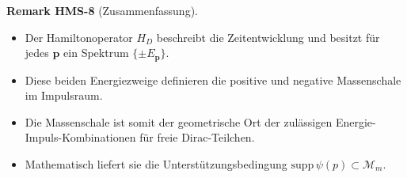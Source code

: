 \documentclass[10pt, letterpaper]{article}
\newcommand{\CustomHeading}[3]{%
  \par\medskip\noindent%
  \textbf{#1 #2} \textnormal{(#3)}.\enskip%
}
\newenvironment{REM}[2]{\begin{unitbox}\CustomHeading{Remark}{#1}{#2}}{\end{unitbox}}
\begin{document}
\begin{REM}{HMS-8}{Zusammenfassung}
\begin{itemize}
\item Der Hamiltonoperator $H_D$ beschreibt die Zeitentwicklung und besitzt für jedes $\mathbf p$ ein Spektrum $\{\pm E_{\mathbf p}\}$.
\item Diese beiden Energiezweige definieren die positive und negative Massenschale im Impulsraum.
\item Die Massenschale ist somit der geometrische Ort der zulässigen Energie-Impuls-Kombinationen für freie Dirac-Teilchen.
\item Mathematisch liefert sie die Unterstützungsbedingung $\mathrm{supp}\,\psi(p)\subset\mathcal M_m$.
\end{itemize}
\end{REM}
\end{document}
